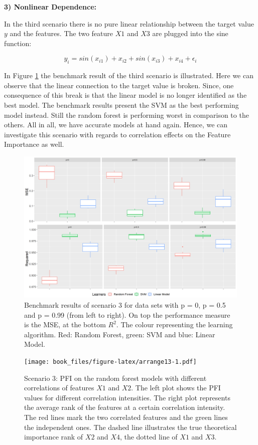 \documentclass[]{krantz}
\begin{document}
\textbf{3) Nonlinear Dependence:}

In the third scenario there is no pure linear relationship between the
target value \(y\) and the features. The two feature \(X1\) and \(X3\)
are plugged into the sine function:

\[
y_{i} = sin(x_{i1})+x_{i2}+sin(x_{i3})+x_{i4}+\epsilon_{i}
\]

In Figure \ref{fig:bmr04} the benchmark result of the third scenario is
illustrated. Here we can observe that the linear connection to the
target value is broken. Since, one consequence of this break is that the
linear model is no longer identified as the best model. The benchmark
results present the SVM as the best performing model instead. Still the
random forest is performing worst in comparison to the others. All in
all, we have accurate models at hand again. Hence, we can investigate
this scenario with regards to correlation effects on the Feature
Importance as well.

\begin{figure}

{\centering \includegraphics[width=1\linewidth]{images/bmr04} 

}

\caption{Benchmark results of scenario 3 for data sets with p = 0, p = 0.5 and p = 0.99 (from left to right). On top the performance measure is the MSE, at the bottom $R^2$. The colour representing the learning algorithm. Red: Random Forest, green: SVM and blue: Linear Model. }\label{fig:bmr04}
\end{figure}

\begin{figure}
\centering
\texttt{[image: book\_files/figure-latex/arrange13-1.pdf]}
\caption{\label{fig:arrange13}Scenario 3: PFI on the random forest models
with different correlations of features \(X1\) and \(X2\). The left plot
shows the PFI values for different correlation intensities. The right
plot represents the average rank of the features at a certain
correlation intensity. The red lines mark the two correlated features
and the green lines the independent ones. The dashed line illustrates
the true theoretical importance rank of \(X2\) and \(X4\), the dotted
line of \(X1\) and \(X3\).}
\end{figure}
\end{document}
